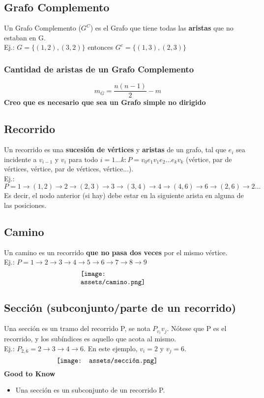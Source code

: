 \documentclass[10pt,a4paper]{article}
\begin{document}
\subsection*{Grafo Complemento}
Un Grafo Complemento ($G^{C}$) es el Grafo que tiene todas las \textbf{aristas} que no estaban en G. \\
Ej.: $G = \{(1, 2), (3, 2)\}$ entonces $ G^{c} = \{(1, 3), (2, 3)\}$
\subsubsection*{Cantidad de aristas de un Grafo Complemento}
\[m_{\overline{G}} = \frac{n(n-1)}{2} - m\]
\textbf{Creo que es necesario que sea un Grafo simple no dirigido}
\subsection*{Recorrido}
Un recorrido es una \textbf{sucesión de vértices} y \textbf{aristas} de un grafo, tal que $e_{i}$ sea incidente a $v_{i-1}$ y $v_{i}$ para todo $i = 1...k : P = v_{0}e_{1}v_{1}e_{2}...e_{k}v_{k}$ (vértice, par de vértices, vértice, par de vértices, vértice...). \\
Ej.: $P = 1 \rightarrow (1,2) \rightarrow 2 \rightarrow (2,3) \rightarrow 3 \rightarrow (3,4) \rightarrow 4 \rightarrow (4,6) \rightarrow 6 \rightarrow (2,6) \rightarrow 2 ...$ \\
Es decir, el nodo anterior (si hay) debe estar en la siguiente arista en alguna de las posiciones.
\subsection*{Camino}
Un camino es un recorrido \textbf{que no pasa dos veces} por el mismo vértice. \\
Ej.: $P = 1 \rightarrow 2 \rightarrow 3 \rightarrow 4 \rightarrow 5 \rightarrow 6 \rightarrow 7 \rightarrow 8 \rightarrow 9$
\[\begin{minipage}[b]{0.4\textwidth}
    \texttt{[image: assets/camino.png]}
\end{minipage}\]
\subsection*{Sección (subconjunto/parte de un recorrido)}
Una sección es un tramo del recorrido P, se nota $P_{v_{i}}{v_{j}}$. Nótese que P es el recorrido, y los subíndices es aquello que acota al mismo. \\
Ej.: $P_{2,6} = 2 \rightarrow 3 \rightarrow 4 \rightarrow 6$. En este ejemplo, $v_{i} = 2$ y $v_{j} = 6$.
\[\begin{minipage}[b]{0.6\textwidth}
    \texttt{[image: assets/sección.png]}
\end{minipage}\]
\textbf{Good to Know}
\begin{itemize}
    \item Una sección es un subconjunto de un recorrido P.
\end{itemize}
\end{document}
